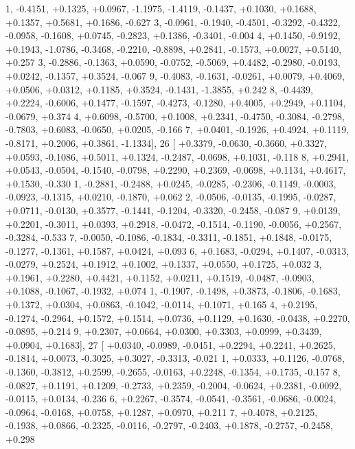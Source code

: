 \begin{DoxyCode}
      1, -0.4151, +0.1325, +0.0967, -1.1975, -1.4119, -0.1437, +0.1030, +0.1688, +0.1357, +0.5681, +0.1686, -0.627
      3, -0.0961, -0.1940, -0.4501, -0.3292, -0.4322, -0.0958, -0.1608, +0.0745, -0.2823, +0.1386, -0.3401, -0.004
      4, +0.1450, -0.9192, +0.1943, -1.0786, -0.3468, -0.2210, -0.8898, +0.2841, -0.1573, +0.0027, +0.5140, +0.257
      3, -0.2886, -0.1363, +0.0590, -0.0752, -0.5069, +0.4482, -0.2980, -0.0193, +0.0242, -0.1357, +0.3524, -0.067
      9, -0.4083, -0.1631, -0.0261, +0.0079, +0.4069, +0.0506, +0.0312, +0.1185, +0.3524, -0.1431, -1.3855, +0.242
      8, -0.4439, +0.2224, -0.6006, +0.1477, -0.1597, -0.4273, -0.1280, +0.4005, +0.2949, +0.1104, -0.0679, +0.374
      4, +0.6098, -0.5700, +0.1008, +0.2341, -0.4750, -0.3084, -0.2798, -0.7803, +0.6083, -0.0650, +0.0205, -0.166
      7, +0.0401, -0.1926, +0.4924, +0.1119, -0.8171, +0.2006, +0.3861, -1.1334],
26 [ +0.3379, -0.0630, -0.3660, +0.3327, +0.0593, -0.1086, +0.5011, +0.1324, -0.2487, -0.0698, +0.1031, -0.118
      8, +0.2941, +0.0543, -0.0504, -0.1540, -0.0798, +0.2290, +0.2369, -0.0698, +0.1134, +0.4617, +0.1530, -0.330
      1, -0.2881, -0.2488, +0.0245, -0.0285, -0.2306, -0.1149, -0.0003, -0.0923, -0.1315, +0.0210, -0.1870, +0.062
      2, -0.0506, -0.0135, -0.1995, -0.0287, +0.0711, -0.0130, +0.3577, -0.1441, -0.1204, -0.3320, -0.2458, -0.087
      9, +0.0139, +0.2201, -0.3011, +0.0393, +0.2918, -0.0472, -0.1514, -0.1190, -0.0056, +0.2567, -0.3284, -0.533
      7, -0.0050, -0.1086, -0.1834, -0.3311, -0.1851, +0.1848, -0.0175, -0.1277, -0.1361, +0.1587, +0.0424, +0.093
      6, +0.1683, -0.0294, +0.1407, -0.0313, -0.0279, +0.2524, +0.1912, +0.1002, +0.1337, +0.0550, +0.1725, +0.032
      3, +0.1961, +0.2280, +0.4421, +0.1152, +0.0211, +0.1519, -0.0487, -0.0903, +0.1088, -0.1067, -0.1932, +0.074
      1, -0.1907, -0.1498, +0.3873, -0.1806, -0.1683, +0.1372, +0.0304, +0.0863, -0.1042, -0.0114, +0.1071, +0.165
      4, +0.2195, -0.1274, -0.2964, +0.1572, +0.1514, +0.0736, +0.1129, +0.1630, -0.0438, +0.2270, -0.0895, +0.214
      9, +0.2307, +0.0664, +0.0300, +0.3303, +0.0999, +0.3439, +0.0904, +0.1683],
27 [ +0.0340, -0.0989, -0.0451, +0.2294, +0.2241, +0.2625, -0.1814, +0.0073, -0.3025, +0.3027, -0.3313, -0.021
      1, +0.0333, +0.1126, -0.0768, -0.1360, -0.3812, +0.2599, -0.2655, -0.0163, +0.2248, -0.1354, +0.1735, -0.157
      8, -0.0827, +0.1191, +0.1209, -0.2733, +0.2359, -0.2004, -0.0624, +0.2381, -0.0092, -0.0115, +0.0134, -0.236
      6, +0.2267, -0.3574, -0.0541, -0.3561, -0.0686, -0.0024, -0.0964, -0.0168, +0.0758, +0.1287, +0.0970, +0.211
      7, +0.4078, +0.2125, -0.1938, +0.0866, -0.2325, -0.0116, -0.2797, -0.2403, +0.1878, -0.2757, -0.2458, +0.298

\end{DoxyCode}

